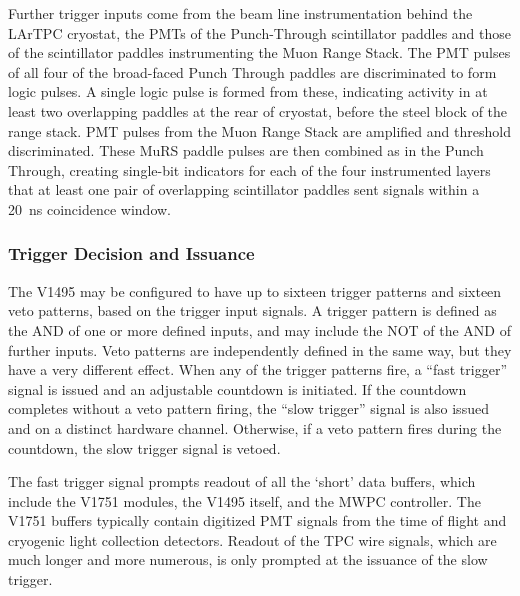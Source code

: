 Further trigger inputs come from the beam line instrumentation behind the LArTPC cryostat, the PMTs of the Punch-Through scintillator paddles and those of the scintillator paddles instrumenting the Muon Range Stack.  The PMT pulses of all four of the broad-faced Punch Through paddles are discriminated to form logic pulses.  A single logic pulse is formed from these, indicating activity in at least two overlapping paddles at the rear of cryostat, before the steel block of the range stack.  PMT pulses from the Muon Range Stack are amplified and threshold discriminated.  These MuRS paddle pulses are then combined as in the Punch Through, creating single-bit indicators for each of the four instrumented layers that at least one pair of overlapping scintillator paddles sent signals within a 20~ns coincidence window.

\subsubsection{Trigger Decision and Issuance}

The V1495 may be configured to have up to sixteen trigger patterns and sixteen veto patterns, based on the trigger input signals.  A trigger pattern is defined as the AND of one or more defined inputs, and may include the NOT of the AND of further inputs.  Veto patterns are independently defined in the same way, but they have a very different effect.  When any of the trigger patterns fire, a ``fast trigger'' signal is issued and an adjustable countdown is initiated.  If the countdown completes without a veto pattern firing, the ``slow trigger'' signal is also issued and on a distinct hardware channel. Otherwise, if a veto pattern fires during the countdown, the slow trigger signal is vetoed.  

The fast trigger signal prompts readout of all the `short' data buffers, which include the V1751 modules, the V1495 itself, and the MWPC controller.  The V1751 buffers typically contain digitized PMT signals from the time of flight and cryogenic light collection detectors. Readout of the TPC wire signals, which are much longer and more numerous, is only prompted at the issuance of the slow trigger.





